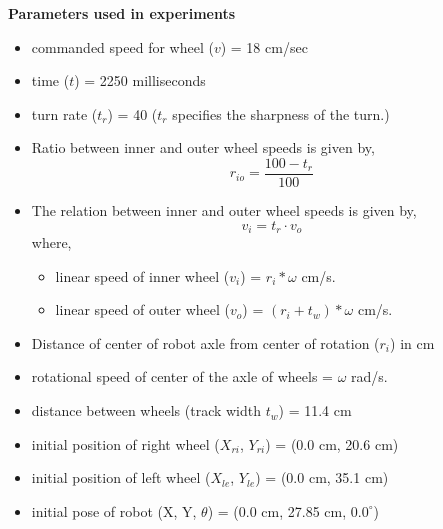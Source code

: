 \textbf{Parameters used in experiments}
\begin{itemize}
	\item commanded speed for wheel ($v$) = 18 cm/sec
	\item time ($t$) = 2250 milliseconds
	\item turn rate ($t_r$) = 40 ($t_r$ specifies the sharpness of the turn.)
	\item Ratio between inner and outer wheel speeds is given by,
	\begin{equation}
	r_{io} = \frac{100 - t_r}{100}
	\end{equation}
	\item The relation between inner and outer wheel speeds is given by,
	\begin{equation}
	v_i = t_r \cdot v_o
	\end{equation}
	where,
	\begin{itemize}
	\item linear speed of inner wheel ($v_i$) = $r_i * \omega$ cm/s.
	\item linear speed of outer wheel ($v_o$) = $(r_i + t_w ) * \omega$ cm/s.
	\end{itemize}
	\item Distance of center of robot axle from center of rotation ($r_i$) in cm 
	\item rotational speed of center of the axle of wheels = $\omega$ rad/s.
	\item distance between wheels (track width $t_w$) = 11.4 cm 
	\item initial position of right wheel ($X_{ri}$, $Y_{ri}$) = (0.0 cm, 20.6 cm) 
	\item initial position of left wheel ($X_{le}$, $Y_{le}$) = (0.0 cm, 35.1 cm)
	\item initial pose of robot (X, Y, $\theta$) = (0.0 cm, 27.85 cm, $0.0^{\circ}$)
\end{itemize}


